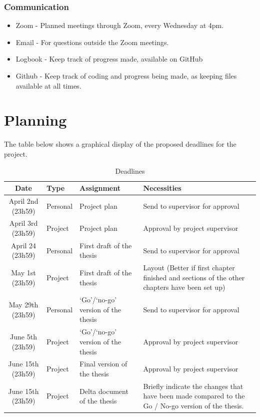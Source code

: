\documentclass{uva-inf-article}
\begin{document}
\subsubsection{Communication}
\begin{itemize}
    \item Zoom - Planned meetings through Zoom, every Wednesday at 4pm.
    \item Email - For questions outside the Zoom meetings.
    \item Logbook - Keep track of progress made, available on GitHub
    \item Github - Keep track of coding and progress being made, as keeping files available at all times.
\end{itemize}

\section{Planning}
The table below shows a graphical display of the proposed deadlines for the project.
\begin{table}[H]
\centering
\caption{Deadlines}
\label{my-label}
\begin{tabular}{cp{1cm}p{5cm}p{5cm}}
Date & Type & Assignment & Necessities  \\
\hline
April 2nd (23h59) & Personal & Project plan & Send to supervisor for approval \\
April 3rd (23h59) & Project & Project plan & Approval by project supervisor \\
April 24 (23h59) & Personal & First draft of the thesis & Send to supervisor for approval \\
May 1st (23h59) & Project & First draft of the thesis & Layout (Better if first chapter finished and sections of the other chapters have been set up)\\
May 29th (23h59) & Personal & `Go'/`no-go' version of the thesis & Send to supervisor for approval \\
June 5th (23h59) & Project & `Go'/`no-go' version of the thesis & Approval by project supervisor \\
June 15th (23h59) & Project & Final version of the thesis & Approval by project supervisor \\
June 15th (23h59) & Project & Delta document of the thesis & Briefly indicate the changes that have been made compared to the Go / No-go version of the thesis.
\end{tabular}
\end{table}
\end{document}
